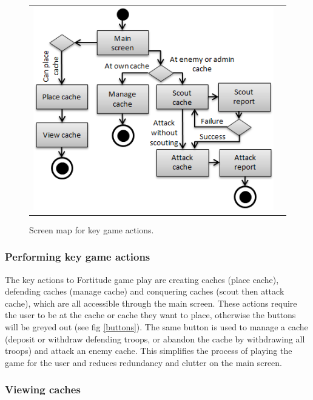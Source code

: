\begin{figure}[h!]
\begin{tabular}{cc}
\begin{minipage}{0.5\textwidth}
		\includegraphics[width=1\textwidth]{images/key_actions}
	\caption{Screen map for key game actions.}
	\label{key_actions}
	\end{minipage}
\end{tabular}
\vspace{-20pt}
\end{figure}

\newpage
\subsubsection{Performing key game actions}

The key actions to Fortitude game play are creating caches (place cache), defending caches (manage cache) and conquering caches (scout then attack cache), which are all accessible through the main screen. These actions require the user to be at the cache or cache they want to place, otherwise the buttons will be greyed out (see fig \ref{buttons}). The same button is used to manage a cache (deposit or withdraw defending troops, or abandon the cache by withdrawing all troops) and attack an enemy cache. This simplifies the process of playing the game for the user and reduces redundancy and clutter on the main screen.

\subsubsection{Viewing caches}

